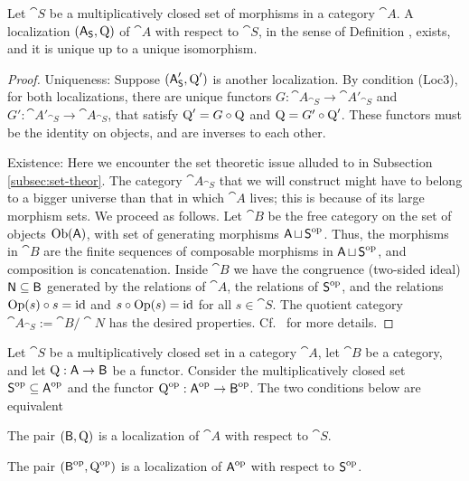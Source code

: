 \begin{thm} \label{thm:2310}
Let $\cat{S}$ be a multiplicatively closed set of morphisms in a category 
$\cat{A}$. A localization 
$(\operatorname{\mathsf{A}}_{\operatorname{\mathsf{S}}}, \operatorname{Q})$ of 
$\cat{A}$ with respect to $\cat{S}$, in the sense of Definition 
\tup{\ref{dfn:1406}}, exists, and it is unique up to a unique isomorphism. 
\end{thm}

\begin{proof}
Uniqueness: Suppose $(\operatorname{\mathsf{A}}'_{\operatorname{\mathsf{S}}}, \operatorname{Q}')$ is another localization.
By condition (Loc3), for both localizations, there are unique functors 
$G : \cat{A}_{\cat{S}} \to \cat{A}'_{\cat{S}}$
and 
$G' : \cat{A}'_{\cat{S}} \to \cat{A}_{\cat{S}}$,
that satisfy 
$\operatorname{Q}' = G \circ \operatorname{Q}$ and 
$\operatorname{Q} = G' \circ \operatorname{Q}'$. These functors must be the identity on 
objects, and are inverses to each other. 

Existence: Here we encounter the set theoretic issue alluded to in Subsection 
\ref{subsec:set-theor}. The category $\cat{A}_{\cat{S}}$ that we will construct 
might have to belong to a bigger universe than that in which $\cat{A}$ lives; 
this is because of its large morphism sets. 
We proceed as follows. Let $\cat{B}$ be the free category on the set of objects 
$\operatorname{Ob}(\operatorname{\mathsf{A}})$, with set of generating morphisms 
$\operatorname{\mathsf{A}} \sqcup \operatorname{\mathsf{S}}^{\mathrm{op}}$.
Thus, the morphisms in $\cat{B}$ are the finite
sequences of composable morphisms in $\operatorname{\mathsf{A}} \sqcup \operatorname{\mathsf{S}}^{\mathrm{op}}$, and 
composition is concatenation. Inside $\cat{B}$ we have the congruence 
(two-sided 
ideal) $\operatorname{\mathsf{N}} \subseteq \operatorname{\mathsf{B}}$ generated by the relations of $\cat{A}$, 
the relations of $\operatorname{\mathsf{S}}^{\mathrm{op}}$, and the 
relations $\operatorname{Op}(s) \circ s = \operatorname{id}$ and 
$s \circ \operatorname{Op}(s) = \operatorname{id}$ for all $s \in \cat{S}$. 
The quotient category 
$\cat{A}_{\cat{S}} := \cat{B} / \cat{N}$ has the desired properties. 
Cf.\ \cite{GaZi} for more details. 
\end{proof}

\begin{prop} \label{prop:3030}
Let $\cat{S}$ be a multiplicatively closed set in a category $\cat{A}$, 
let $\cat{B}$ be a category, 
and let $\operatorname{Q} : \operatorname{\mathsf{A}} \to \operatorname{\mathsf{B}}$ be a functor. 
Consider the multiplicatively closed set 
$\operatorname{\mathsf{S}}^{\mathrm{op}} \subseteq \operatorname{\mathsf{A}}^{\mathrm{op}}$ and the functor 
$\operatorname{Q}^{\mathrm{op}} : \operatorname{\mathsf{A}}^{\mathrm{op}} \to \operatorname{\mathsf{B}}^{\mathrm{op}}$. 
The two conditions below are equivalent\tup{:}
\begin{itemize}
 The pair $(\operatorname{\mathsf{B}}, \operatorname{Q})$ is a localization of 
$\cat{A}$ with respect to $\cat{S}$. 

 The pair $(\operatorname{\mathsf{B}}^{\mathrm{op}}, \operatorname{Q}^{\mathrm{op}})$ is a  
localization of $\operatorname{\mathsf{A}}^{\mathrm{op}}$ with respect to $\operatorname{\mathsf{S}}^{\mathrm{op}}$. 
\end{itemize}
\end{prop}

